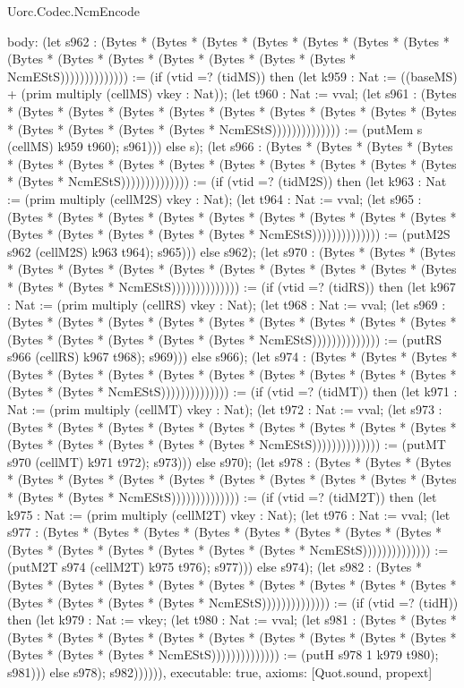 \begin{lexlean}{Uorc.Codec.NcmEncode}
\begin{semanticmodule}
{  body: (let s962 : (Bytes * (Bytes * (Bytes * (Bytes * (Bytes * (Bytes * (Bytes * (Bytes * (Bytes * (Bytes * (Bytes * (Bytes * (Bytes * (Bytes * NcmEStS)))))))))))))) := (if (vtid =? (tidMS)) then (let k959 : Nat := ((baseMS) + (prim multiply (cellMS) vkey : Nat)); (let t960 : Nat := vval; (let s961 : (Bytes * (Bytes * (Bytes * (Bytes * (Bytes * (Bytes * (Bytes * (Bytes * (Bytes * (Bytes * (Bytes * (Bytes * (Bytes * (Bytes * NcmEStS)))))))))))))) := (putMem s (cellMS) k959 t960); s961))) else s); (let s966 : (Bytes * (Bytes * (Bytes * (Bytes * (Bytes * (Bytes * (Bytes * (Bytes * (Bytes * (Bytes * (Bytes * (Bytes * (Bytes * (Bytes * NcmEStS)))))))))))))) := (if (vtid =? (tidM2S)) then (let k963 : Nat := (prim multiply (cellM2S) vkey : Nat); (let t964 : Nat := vval; (let s965 : (Bytes * (Bytes * (Bytes * (Bytes * (Bytes * (Bytes * (Bytes * (Bytes * (Bytes * (Bytes * (Bytes * (Bytes * (Bytes * (Bytes * NcmEStS)))))))))))))) := (putM2S s962 (cellM2S) k963 t964); s965))) else s962); (let s970 : (Bytes * (Bytes * (Bytes * (Bytes * (Bytes * (Bytes * (Bytes * (Bytes * (Bytes * (Bytes * (Bytes * (Bytes * (Bytes * (Bytes * NcmEStS)))))))))))))) := (if (vtid =? (tidRS)) then (let k967 : Nat := (prim multiply (cellRS) vkey : Nat); (let t968 : Nat := vval; (let s969 : (Bytes * (Bytes * (Bytes * (Bytes * (Bytes * (Bytes * (Bytes * (Bytes * (Bytes * (Bytes * (Bytes * (Bytes * (Bytes * (Bytes * NcmEStS)))))))))))))) := (putRS s966 (cellRS) k967 t968); s969))) else s966); (let s974 : (Bytes * (Bytes * (Bytes * (Bytes * (Bytes * (Bytes * (Bytes * (Bytes * (Bytes * (Bytes * (Bytes * (Bytes * (Bytes * (Bytes * NcmEStS)))))))))))))) := (if (vtid =? (tidMT)) then (let k971 : Nat := (prim multiply (cellMT) vkey : Nat); (let t972 : Nat := vval; (let s973 : (Bytes * (Bytes * (Bytes * (Bytes * (Bytes * (Bytes * (Bytes * (Bytes * (Bytes * (Bytes * (Bytes * (Bytes * (Bytes * (Bytes * NcmEStS)))))))))))))) := (putMT s970 (cellMT) k971 t972); s973))) else s970); (let s978 : (Bytes * (Bytes * (Bytes * (Bytes * (Bytes * (Bytes * (Bytes * (Bytes * (Bytes * (Bytes * (Bytes * (Bytes * (Bytes * (Bytes * NcmEStS)))))))))))))) := (if (vtid =? (tidM2T)) then (let k975 : Nat := (prim multiply (cellM2T) vkey : Nat); (let t976 : Nat := vval; (let s977 : (Bytes * (Bytes * (Bytes * (Bytes * (Bytes * (Bytes * (Bytes * (Bytes * (Bytes * (Bytes * (Bytes * (Bytes * (Bytes * (Bytes * NcmEStS)))))))))))))) := (putM2T s974 (cellM2T) k975 t976); s977))) else s974); (let s982 : (Bytes * (Bytes * (Bytes * (Bytes * (Bytes * (Bytes * (Bytes * (Bytes * (Bytes * (Bytes * (Bytes * (Bytes * (Bytes * (Bytes * NcmEStS)))))))))))))) := (if (vtid =? (tidH)) then (let k979 : Nat := vkey; (let t980 : Nat := vval; (let s981 : (Bytes * (Bytes * (Bytes * (Bytes * (Bytes * (Bytes * (Bytes * (Bytes * (Bytes * (Bytes * (Bytes * (Bytes * (Bytes * (Bytes * NcmEStS)))))))))))))) := (putH s978 1 k979 t980); s981))) else s978); s982)))))),
  executable: true,
  axioms: [Quot.sound, propext]
}


\end{semanticmodule}
\end{lexlean}
